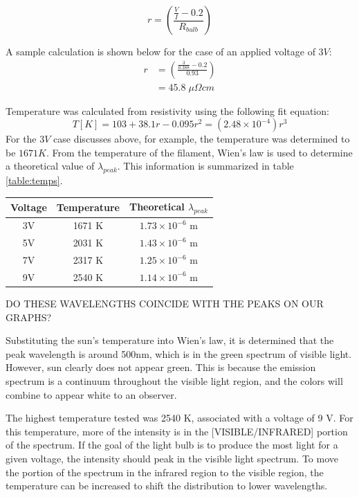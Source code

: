 \documentclass[a4paper]{article}
\begin{document}
\begin{equation}
\label{eq:resistivity}
r =
\left(
\frac{\frac{V}{I}-0.2}{R_{bulb}}
\right)
\end{equation}

A sample calculation is shown below for the case of an applied voltage of $3V$:
\begin{align*}
r &=
\left(
\frac{\frac{3}{0.388}-0.2}{0.93}
\right) \\
&= 45.8 \; \mu \Omega cm
\end{align*}

Temperature was calculated from resistivity using the following fit equation:
$$T[K] = 103 + 38.1r - 0.095r^2 = (2.48\times 10^{-4}) r^3$$
For the $3V$ case discusses above, for example, the temperature was determined to be $1671K$. From the temperature of the filament, Wien's law is used to determine a theoretical value of $\lambda_{peak}$. This information is summarized in table \ref{table:temps}.

\begin{center}
\begin{tabular}{|c|c|c|}
\hline 
Voltage & Temperature & Theoretical $\lambda_{peak}$ \topVspace \bottomVspace \\
\hline
3V & 1671 K & $1.73 \times 10^{-6}$ m \\
5V & 2031 K & $1.43 \times 10^{-6}$ m\\
7V & 2317 K & $1.25 \times 10^{-6}$ m\\
9V & 2540 K & $1.14 \times 10^{-6}$ m\\
\hline
\end{tabular}
\label{table:temps}
\end{center}

DO THESE WAVELENGTHS COINCIDE WITH THE PEAKS ON OUR GRAPHS?

\qq Substituting the sun's temperature into Wien's law, it is determined that the peak wavelength is around 500nm, which is in the green spectrum of visible light. However, sun clearly does not appear green. This is because the emission spectrum is a continuum throughout the visible light region, and the colors will combine to appear white to an observer.

\qq The highest temperature tested was 2540 K, associated with a voltage of 9 V. For this temperature, more of the intensity is in the [VISIBLE/INFRARED] portion of the spectrum. If the goal of the light bulb is to produce the most light for a given voltage, the intensity should peak in the visible light spectrum. To move the portion of the spectrum in the infrared region to the visible region, the temperature can be increased to shift the distribution to lower wavelengths.
\end{document}
